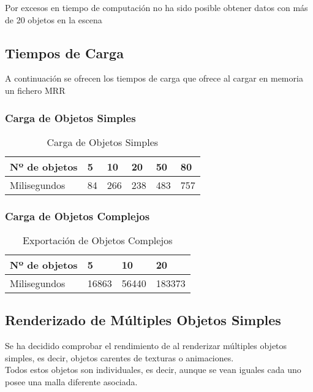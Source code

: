 Por excesos en tiempo de computación no ha sido posible obtener datos con más de 20 objetos en la escena

\subsection{Tiempos de Carga}
A continuación se ofrecen los tiempos de carga que ofrece \robotto al cargar en memoria un fichero MRR

\subsubsection{Carga de Objetos Simples}
\begin{table}[h!]
\centering
\begin{tabular}{|l|l|l|l|l|l|}
\hline
Nº de objetos & 5  & 10 & 20 & 50 & 80 \\ \hline
Milisegundos           & 84 & 266 & 238 & 483 & 757 \\ \hline
\end{tabular}
\caption[Carga de Objetos Simples]{Carga de Objetos Simples}
\label{ll:carsimple}
\end{table}

\subsubsection{Carga de Objetos Complejos}
\begin{table}[h!]
\centering
\begin{tabular}{|l|l|l|l|}
\hline
Nº de objetos & 5  & 10 & 20 \\ \hline
Milisegundos           & 16863 & 56440 & 183373 \\ \hline
\end{tabular}
\caption[Carga de Objetos Complejos]{Exportación de Objetos Complejos}
\label{ll:expcomplejo}
\end{table}



\subsection{Renderizado de Múltiples Objetos Simples}
Se ha decidido comprobar el rendimiento de \robotto al renderizar múltiples objetos simples, es decir, objetos carentes de texturas o animaciones.\\
Todos estos objetos son individuales, es decir, aunque se vean iguales cada uno posee una malla diferente asociada.\\

